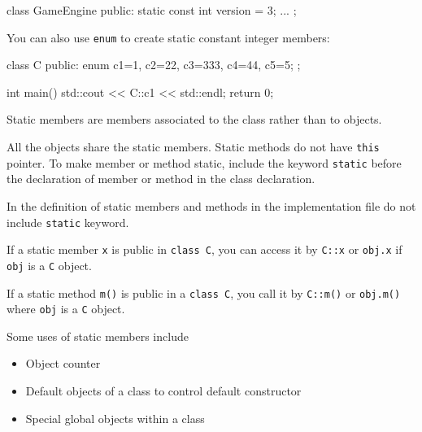\begin{consolethree}[escapeinside=||]
class GameEngine
{
public:
    static const int version = 3;
    ...
};
\end{consolethree}

You can also use \texttt{enum} to create static constant integer members:

\begin{consolethree}[escapeinside=||]
class C
{
public:
    enum {c1=1, c2=22, c3=333, c4=44, c5=5};
};

int main()
{
    std::cout << C::c1 << std::endl;
    return 0;
}
\end{consolethree}



\newpage{}

Static members are members associated to the class rather than to
objects.

All the objects share the static members. Static methods do not have
\texttt{this} pointer. To make member or method static, include the
keyword \texttt{static} before the declaration of member or method in the
class declaration.

In the definition of static members and methods in the implementation
file do not include \texttt{static} keyword.

If a static member \texttt{x} is public in \texttt{class C}, you can access
it by \texttt{C::x} or \texttt{obj.x} if \texttt{obj} is a \texttt{C} object.

If a static method \texttt{m()} is public in a \texttt{class C}, you call it
by \texttt{C::m()} or \texttt{obj.m()} where \texttt{obj} is a \texttt{C}
object.

Some uses of static members include

\begin{itemize}
\item Object counter
\item Default objects of a class to control default constructor
\item Special global objects within a class
\end{itemize}
